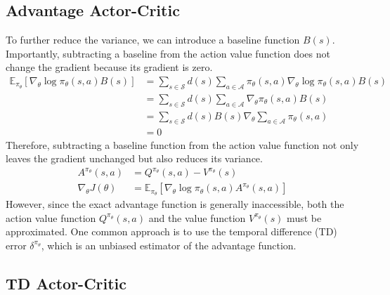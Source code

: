\subsection{Advantage Actor-Critic}
To further reduce the variance, we can introduce a baseline function $B(s)$.
Importantly, subtracting a baseline from the action value function does not change the gradient because its gradient is zero.
\begin{equation}
  \begin{aligned}
    \mathbb{E}_{\pi_\theta} [\nabla_\theta \log \pi_\theta(s, a) B(s)]
    &= \sum_{s \in \mathcal{S}} d(s) \sum_{a \in \mathcal{A}} \pi_\theta(s, a) \nabla_\theta \log \pi_\theta(s, a) B(s) \\
    &= \sum_{s \in \mathcal{S}} d(s) \sum_{a \in \mathcal{A}} \nabla_\theta \pi_\theta(s, a) B(s) \\
    &= \sum_{s \in \mathcal{S}} d(s) B(s) \nabla_\theta \sum_{a \in \mathcal{A}} \pi_\theta(s, a) \\
    &= 0
  \end{aligned}
\end{equation}
Therefore, subtracting a baseline function from the action value function not only leaves the gradient unchanged but also reduces its variance.
\begin{equation} \label{chap2:eq:pg_adv}
  \begin{aligned}
    A^{\pi_\theta}(s, a) &= Q^{\pi_\theta}(s, a) - V^{\pi_\theta}(s) \\
    \nabla_\theta J(\theta) &= \mathbb{E}_{\pi_\theta} [\nabla_\theta \log \pi_\theta(s, a) A^{\pi_\theta}(s, a)]
  \end{aligned}
\end{equation}
However, since the exact advantage function is generally inaccessible, both the action value function $Q^{\pi_\theta}(s, a)$ and the value function $V^{\pi_\theta}(s)$ must be approximated.
One common approach is to use the temporal difference (TD) error $\delta^{\pi_\theta}$, which is an unbiased estimator of the advantage function.

\subsection{TD Actor-Critic}

